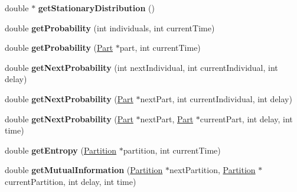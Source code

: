\begin{DoxyCompactItemize}
\item 
\hypertarget{class_markov_process_a6cd7abb0de322eb2ee133eda283388c3}{}double $\ast$ {\bfseries get\+Stationary\+Distribution} ()\label{class_markov_process_a6cd7abb0de322eb2ee133eda283388c3}

\item 
\hypertarget{class_markov_process_a4ed608f200c71a15ae4140b0f1305a88}{}double {\bfseries get\+Probability} (int individuals, int current\+Time)\label{class_markov_process_a4ed608f200c71a15ae4140b0f1305a88}

\item 
\hypertarget{class_markov_process_afe80afb9c456631a9168c762058d3cd2}{}double {\bfseries get\+Probability} (\hyperlink{class_part}{Part} $\ast$part, int current\+Time)\label{class_markov_process_afe80afb9c456631a9168c762058d3cd2}

\item 
\hypertarget{class_markov_process_ab17f4ae9fa56c009553a5d50e899a84b}{}double {\bfseries get\+Next\+Probability} (int next\+Individual, int current\+Individual, int delay)\label{class_markov_process_ab17f4ae9fa56c009553a5d50e899a84b}

\item 
\hypertarget{class_markov_process_a254635ef2e405073dd19aa14aa4ec365}{}double {\bfseries get\+Next\+Probability} (\hyperlink{class_part}{Part} $\ast$next\+Part, int current\+Individual, int delay)\label{class_markov_process_a254635ef2e405073dd19aa14aa4ec365}

\item 
\hypertarget{class_markov_process_a72033d86b846a06449a005f796ec14c1}{}double {\bfseries get\+Next\+Probability} (\hyperlink{class_part}{Part} $\ast$next\+Part, \hyperlink{class_part}{Part} $\ast$current\+Part, int delay, int time)\label{class_markov_process_a72033d86b846a06449a005f796ec14c1}

\item 
\hypertarget{class_markov_process_ad1d295d33c8abc5bdabea3eeaf33b553}{}double {\bfseries get\+Entropy} (\hyperlink{class_partition}{Partition} $\ast$partition, int current\+Time)\label{class_markov_process_ad1d295d33c8abc5bdabea3eeaf33b553}

\item 
\hypertarget{class_markov_process_a37aa6fee427f28a0d44dc369a2fd3b6a}{}double {\bfseries get\+Mutual\+Information} (\hyperlink{class_partition}{Partition} $\ast$next\+Partition, \hyperlink{class_partition}{Partition} $\ast$current\+Partition, int delay, int time)\label{class_markov_process_a37aa6fee427f28a0d44dc369a2fd3b6a}


\end{DoxyCompactItemize}
